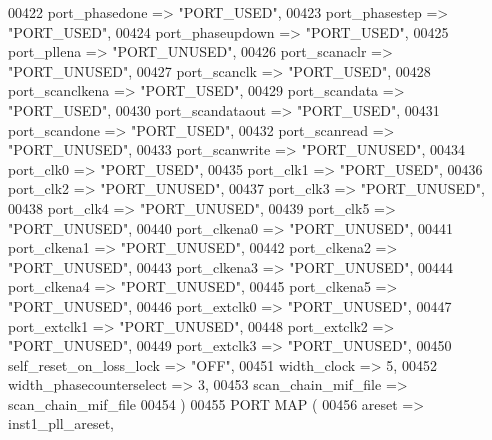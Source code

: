 \begin{DoxyCode}
00422       port\_phasedone             => \textcolor{keyword}{"PORT\_USED"},
00423       port\_phasestep             => \textcolor{keyword}{"PORT\_USED"},
00424       port\_phaseupdown           => \textcolor{keyword}{"PORT\_USED"},
00425       port\_pllena                => \textcolor{keyword}{"PORT\_UNUSED"},
00426       port\_scanaclr              => \textcolor{keyword}{"PORT\_UNUSED"},
00427       port\_scanclk               => \textcolor{keyword}{"PORT\_USED"},
00428       port\_scanclkena            => \textcolor{keyword}{"PORT\_USED"},
00429       port\_scandata              => \textcolor{keyword}{"PORT\_USED"},
00430       port\_scandataout           => \textcolor{keyword}{"PORT\_USED"},
00431       port\_scandone              => \textcolor{keyword}{"PORT\_USED"},
00432       port\_scanread              => \textcolor{keyword}{"PORT\_UNUSED"},
00433       port\_scanwrite             => \textcolor{keyword}{"PORT\_UNUSED"},
00434       port\_clk0                  => \textcolor{keyword}{"PORT\_USED"},
00435       port\_clk1                  => \textcolor{keyword}{"PORT\_USED"},
00436       port\_clk2                  => \textcolor{keyword}{"PORT\_UNUSED"},
00437       port\_clk3                  => \textcolor{keyword}{"PORT\_UNUSED"},
00438       port\_clk4                  => \textcolor{keyword}{"PORT\_UNUSED"},
00439       port\_clk5                  => \textcolor{keyword}{"PORT\_UNUSED"},
00440       port\_clkena0               => \textcolor{keyword}{"PORT\_UNUSED"},
00441       port\_clkena1               => \textcolor{keyword}{"PORT\_UNUSED"},
00442       port\_clkena2               => \textcolor{keyword}{"PORT\_UNUSED"},
00443       port\_clkena3               => \textcolor{keyword}{"PORT\_UNUSED"},
00444       port\_clkena4               => \textcolor{keyword}{"PORT\_UNUSED"},
00445       port\_clkena5               => \textcolor{keyword}{"PORT\_UNUSED"},
00446       port\_extclk0               => \textcolor{keyword}{"PORT\_UNUSED"},
00447       port\_extclk1               => \textcolor{keyword}{"PORT\_UNUSED"},
00448       port\_extclk2               => \textcolor{keyword}{"PORT\_UNUSED"},
00449       port\_extclk3               => \textcolor{keyword}{"PORT\_UNUSED"},
00450       self\_reset\_on\_loss\_lock    => \textcolor{keyword}{"OFF"},
00451       width\_clock                => \textcolor{vhdllogic}{5},
00452       width\_phasecounterselect   => \textcolor{vhdllogic}{3},
00453       scan\_chain\_mif\_file        => scan_chain_mif_file
00454 \textcolor{vhdlchar}{)}
00455 \textcolor{keywordflow}{PORT} \textcolor{keywordflow}{MAP} (
00456       areset               => inst1_pll_areset,

\end{DoxyCode}
